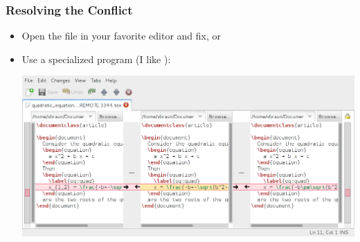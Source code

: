 \begin{frame}
  \frametitle{Resolving the Conflict}

  \begin{itemize}
  \item Open the file in your favorite editor and fix, or
  \item Use a specialized program (I like ): \\
    \medskip

    \includegraphics[width=\linewidth]{images/mergetool_meld}
  \end{itemize}
\end{frame}




